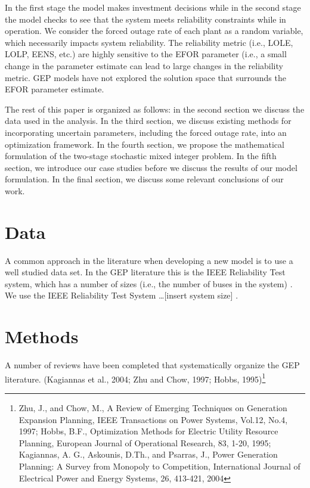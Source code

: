 \documentclass[10pt]{amsart}
\begin{document}
In the first stage the model makes investment decisions while in the second stage the model checks to see that the system meets reliability constraints while in operation. 
We consider the forced outage rate of each plant as a random variable, which necessarily impacts system reliability. 
The reliability metric (i.e., LOLE, LOLP, EENS, etc.) are highly sensitive to the EFOR parameter (i.e., a small change in the parameter estimate can lead to large changes in the reliability metric. 
GEP models have not explored the solution space that surrounds the EFOR parameter estimate. 

The rest of this paper is organized as follows: in the second section we discuss the data used in the analysis. 
In the third section, we discuss existing methods for incorporating uncertain parameters, including the forced outage rate, into an optimization framework.
In the fourth section, we propose the mathematical formulation of the two-stage stochastic mixed integer problem. 
In the fifth section, we introduce our case studies before we discuss the results of our model formulation.
In the final section, we discuss some relevant conclusions of our work. 

\section{Data}
A common approach in the literature when developing a new model is to use a well studied data set. 
In the GEP literature this is the IEEE Reliability Test system, which has a number of sizes (i.e., the number of buses in the system) \parencite{billinton:1994aa}. 
We use the IEEE Reliability Test System \ldots [insert system size] \parencite{}. 

\section{Methods}
A number of reviews have been completed that systematically organize the GEP literature.
\parencite{bakirtzis:2012aa, hemmati:2013ab}(Kagiannas et al., 2004; Zhu and Chow, 1997; Hobbs, 1995)\footnote{ Zhu, J., and Chow, M., A Review of Emerging Techniques on Generation Expansion
Planning, IEEE Transactions on Power Systems, Vol.12, No.4, 1997; Hobbs, B.F., Optimization Methods for Electric Utility Resource Planning, European
Journal of Operational Research, 83, 1-20, 1995; 
Kagiannas, A. G., Askounis, D.Th., and Psarras, J., Power Generation Planning: A Survey
from Monopoly to Competition, International Journal of Electrical Power and Energy
Systems, 26, 413-421, 2004}
\end{document}
